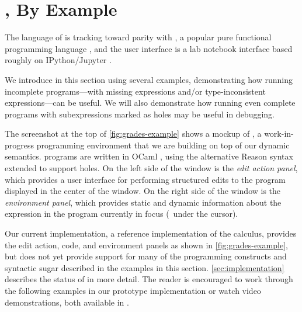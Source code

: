 \newcommand{\examplesSec}{\HazelnutLive, By Example}
\section{\protect\examplesSec} %
\label{sec:examples}

\newcommand{\overviewExample}[2]{\paragraph{Example {#1}: {#2}}}

The language of \Hazel is tracking toward parity with \Elm, a popular pure functional programming language \cite{czaplicki2012elm,Elm}, 
and the user interface is a lab notebook interface based roughly on IPython/Jupyter \cite{Perez:2007:ISI:1251563.1251831}. 

We introduce \HazelnutLive{} in this section using several examples,
demonstrating how running incomplete programs---with missing expressions and/or
type-inconsistent expressions---can be useful.
%
We will also demonstrate how running even complete programs with subexpressions
marked as holes may be useful in debugging.

The screenshot at the top of \autoref{fig:grades-example} shows a mockup of
\Hazel{}, a work-in-progress programming environment that we are building on top
of our dynamic semantics.
%
\Hazel{} programs are written in OCaml \cite{leroy03:_ocaml}, using the
alternative Reason syntax \cite{reason-what} extended to support holes.
%
On the left side of the window is the \emph{edit action panel}, which
provides a user interface for performing structured edits to the program
displayed in the center of the window.
%
On the right side of the window is the \emph{environment panel}, which provides
static and dynamic information about the expression in the program currently in
focus (\ie{}~under the cursor).

Our current implementation, a reference implementation of the \HazelnutLive{}
calculus, provides the edit action, code, and environment panels as shown in
\autoref{fig:grades-example}, but does not yet provide support for many of the
programming constructs and syntactic sugar described in the examples in this
section.
%
\autoref{sec:implementation} describes the status of \HazelnutLive{} in more
detail.
%
%
%
The reader is encouraged 
to work through the following examples in our prototype
implementation or watch video demonstrations, both available in
\suppMaterials{}.


